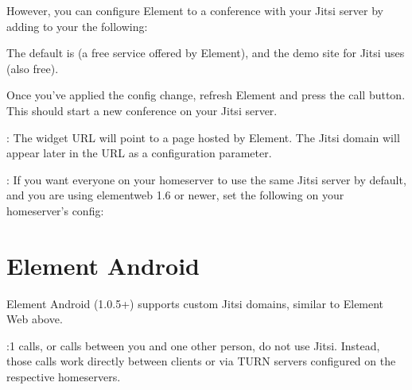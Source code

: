 \documentclass[letterpaper,10pt,openany,oneside,english]{sphinxmanual}
\begin{document}
\sphinxAtStartPar
However, you can configure Element to  a conference with your Jitsi server by adding
to your  the following:

\begin{sphinxVerbatim}[commandchars=\\\{\}]
   
     
\end{sphinxVerbatim}

\sphinxAtStartPar
The default is  (a free service offered by Element), and the demo site for
Jitsi uses  (also free).

\sphinxAtStartPar
Once you’ve applied the config change, refresh Element and press the call button. This
should start a new conference on your Jitsi server.

\sphinxAtStartPar
{}: The widget URL will point to a  page hosted by Element. The Jitsi
domain will appear later in the URL as a configuration parameter.

\sphinxAtStartPar
{}: If you want everyone on your homeserver to use the same Jitsi server by
default, and you are using element\sphinxhyphen{}web 1.6 or newer, set the following on your homeserver’s
 config:

\begin{sphinxVerbatim}[commandchars=\\\{\}]
   
     
\end{sphinxVerbatim}


\chapter{Element Android}
\label{\detokenize{jitsi:element-android}}
\sphinxAtStartPar
Element Android (1.0.5+) supports custom Jitsi domains, similar to Element Web above.

:1 calls, or calls between you and one other person, do not use Jitsi. Instead, those
calls work directly between clients or via TURN servers configured on the respective
homeservers.
\end{document}
